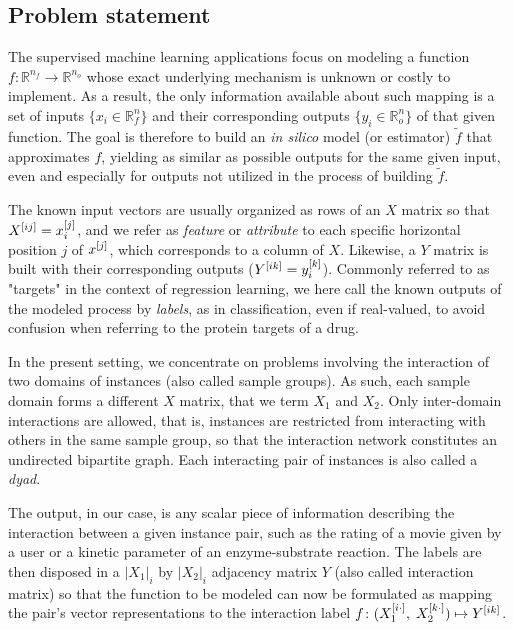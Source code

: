 \subsection{Problem statement}
\label{sec:problem_statement}

The supervised machine learning applications focus on modeling a function $f
\colon \mathbb{R}^{n_f} \to \mathbb{R}^{n_o}$ whose exact underlying mechanism
is unknown or costly to implement. As a result, the only information available
about such mapping is a set of inputs $\{x_i \in \mathbb R^n_f\}$ and their
corresponding outputs $\{y_i \in \mathbb R^n_o\}$ of that given function. The
goal is therefore to build an \textit{in silico} model (or estimator) $\tilde f$
that approximates $f$, yielding as similar as possible outputs for the same
given input, even and especially for outputs not utilized in the process of
building $\tilde f$.


The known input vectors are usually organized as rows of an $X$ matrix so that
$X^{[ij]} = x_i^{[j]}$, and we refer as \emph{feature} or \emph{attribute} to
each specific horizontal position $j$ of $x^{[j]}$, which corresponds to a column
of $X$. Likewise, a $Y$ matrix is built with their corresponding outputs
($Y^{[ik]} = y_i^{[k]}$). Commonly referred to as "targets" in the context of
regression learning, we here call the known outputs of the modeled process by
\emph{labels}, as in classification, even if real-valued, to avoid confusion
when referring to the protein targets of a drug.

In the present setting, we concentrate on problems involving the interaction of
two domains of instances (also called sample groups). As such, each sample
domain forms a different $X$ matrix, that we term $X_1$ and $X_2$. Only
inter-domain interactions are allowed, that is, instances are restricted from
interacting with others in the same sample group, so that the interaction
network constitutes an undirected bipartite graph.
%
Each interacting pair of instances is also called a \emph{dyad}.

The output, in our case, is any scalar piece of information describing the
interaction between a given instance pair, such as the rating of a movie given
by a user or a kinetic parameter of an enzyme-substrate reaction.
The labels are
then disposed in a $|X_1|_i$ by $|X_2|_i$ adjacency matrix $Y$ (also called
interaction matrix) so that the function to be modeled can now be formulated as
mapping the pair's vector representations to the interaction label $f\colon
(X_1^{[i\cdot]},\; X_2^{[k\cdot]}) \mapsto Y^{[ik]}$.

